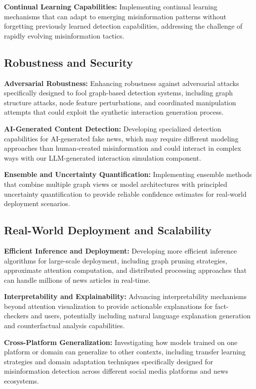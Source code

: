 \textbf{Continual Learning Capabilities:} Implementing continual learning mechanisms that can adapt to emerging misinformation patterns without forgetting previously learned detection capabilities, addressing the challenge of rapidly evolving misinformation tactics.

\subsection{Robustness and Security}

\textbf{Adversarial Robustness:} Enhancing robustness against adversarial attacks specifically designed to fool graph-based detection systems, including graph structure attacks, node feature perturbations, and coordinated manipulation attempts that could exploit the synthetic interaction generation process.

\textbf{AI-Generated Content Detection:} Developing specialized detection capabilities for AI-generated fake news, which may require different modeling approaches than human-created misinformation and could interact in complex ways with our LLM-generated interaction simulation component.

\textbf{Ensemble and Uncertainty Quantification:} Implementing ensemble methods that combine multiple graph views or model architectures with principled uncertainty quantification to provide reliable confidence estimates for real-world deployment scenarios.

\subsection{Real-World Deployment and Scalability}

\textbf{Efficient Inference and Deployment:} Developing more efficient inference algorithms for large-scale deployment, including graph pruning strategies, approximate attention computation, and distributed processing approaches that can handle millions of news articles in real-time.

\textbf{Interpretability and Explainability:} Advancing interpretability mechanisms beyond attention visualization to provide actionable explanations for fact-checkers and users, potentially including natural language explanation generation and counterfactual analysis capabilities.


\textbf{Cross-Platform Generalization:} Investigating how models trained on one platform or domain can generalize to other contexts, including transfer learning strategies and domain adaptation techniques specifically designed for misinformation detection across different social media platforms and news ecosystems.

